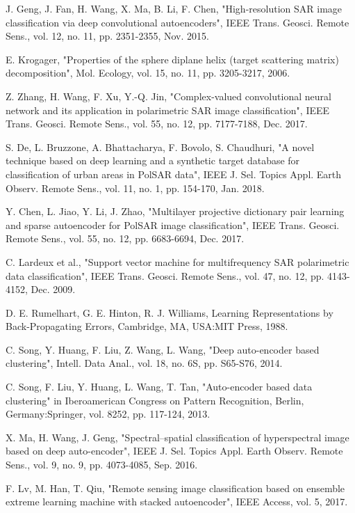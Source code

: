 \documentclass[11pt, a4paper, onecolumn, oneside]{article}
\begin{document}
\begin{thebibliography}{35}
	J. Geng, J. Fan, H. Wang, X. Ma, B. Li, F. Chen, "High-resolution SAR image classification via deep convolutional autoencoders", IEEE Trans. Geosci. Remote Sens., vol. 12, no. 11, pp. 2351-2355, Nov. 2015.

E. Krogager, "Properties of the sphere diplane helix (target scattering matrix) decomposition", Mol. Ecology, vol. 15, no. 11, pp. 3205-3217, 2006.

	Z. Zhang, H. Wang, F. Xu, Y.-Q. Jin, "Complex-valued convolutional neural network and its application in polarimetric SAR image classification", IEEE Trans. Geosci. Remote Sens., vol. 55, no. 12, pp. 7177-7188, Dec. 2017.

	S. De, L. Bruzzone, A. Bhattacharya, F. Bovolo, S. Chaudhuri, "A novel technique based on deep learning and a synthetic target database for classification of urban areas in PolSAR data", IEEE J. Sel. Topics Appl. Earth Observ. Remote Sens., vol. 11, no. 1, pp. 154-170, Jan. 2018.

Y. Chen, L. Jiao, Y. Li, J. Zhao, "Multilayer projective dictionary pair learning and sparse autoencoder for PolSAR image classification", IEEE Trans. Geosci. Remote Sens., vol. 55, no. 12, pp. 6683-6694, Dec. 2017.

C. Lardeux et al., "Support vector machine for multifrequency SAR polarimetric data classification", IEEE Trans. Geosci. Remote Sens., vol. 47, no. 12, pp. 4143-4152, Dec. 2009.

D. E. Rumelhart, G. E. Hinton, R. J. Williams, Learning Representations by Back-Propagating Errors, Cambridge, MA, USA:MIT Press, 1988.

	C. Song, Y. Huang, F. Liu, Z. Wang, L. Wang, "Deep auto-encoder based clustering", Intell. Data Anal., vol. 18, no. 6S, pp. S65-S76, 2014.

C. Song, F. Liu, Y. Huang, L. Wang, T. Tan, "Auto-encoder based data clustering" in Iberoamerican Congress on Pattern Recognition, Berlin, Germany:Springer, vol. 8252, pp. 117-124, 2013.

	X. Ma, H. Wang, J. Geng, "Spectral–spatial classification of hyperspectral image based on deep auto-encoder", IEEE J. Sel. Topics Appl. Earth Observ. Remote Sens., vol. 9, no. 9, pp. 4073-4085, Sep. 2016.

	F. Lv, M. Han, T. Qiu, "Remote sensing image classification based on ensemble extreme learning machine with stacked autoencoder", IEEE Access, vol. 5, 2017.


\end{thebibliography}
\end{document}

